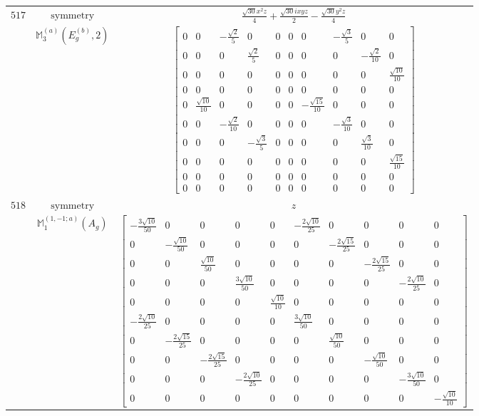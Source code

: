 \documentclass[fleqn,8pt,landscape]{jsarticle}
\begin{document}
\begin{longtable}{ccc}
$ 517 $ & $ \text{symmetry} $ & $ \frac{\sqrt{30} x^{2} z}{4} + \frac{\sqrt{30} i x y z}{2} - \frac{\sqrt{30} y^{2} z}{4} $ \\
$  $ & $ \mathbb{M}_{3}^{(a)}(E_{g}^{(b)},2) $ & $ \begin{bmatrix} 0 & 0 & - \frac{\sqrt{2}}{5} & 0 & 0 & 0 & 0 & - \frac{\sqrt{3}}{5} & 0 & 0 \\ 0 & 0 & 0 & \frac{\sqrt{2}}{5} & 0 & 0 & 0 & 0 & - \frac{\sqrt{2}}{10} & 0 \\ 0 & 0 & 0 & 0 & 0 & 0 & 0 & 0 & 0 & \frac{\sqrt{10}}{10} \\ 0 & 0 & 0 & 0 & 0 & 0 & 0 & 0 & 0 & 0 \\ 0 & \frac{\sqrt{10}}{10} & 0 & 0 & 0 & 0 & - \frac{\sqrt{15}}{10} & 0 & 0 & 0 \\ 0 & 0 & - \frac{\sqrt{2}}{10} & 0 & 0 & 0 & 0 & - \frac{\sqrt{3}}{10} & 0 & 0 \\ 0 & 0 & 0 & - \frac{\sqrt{3}}{5} & 0 & 0 & 0 & 0 & \frac{\sqrt{3}}{10} & 0 \\ 0 & 0 & 0 & 0 & 0 & 0 & 0 & 0 & 0 & \frac{\sqrt{15}}{10} \\ 0 & 0 & 0 & 0 & 0 & 0 & 0 & 0 & 0 & 0 \\ 0 & 0 & 0 & 0 & 0 & 0 & 0 & 0 & 0 & 0 \end{bmatrix} $ \\ \hline
$ 518 $ & $ \text{symmetry} $ & $ z $ \\
$  $ & $ \mathbb{M}_{1}^{(1,-1;a)}(A_{g}) $ & $ \begin{bmatrix} - \frac{3 \sqrt{10}}{50} & 0 & 0 & 0 & 0 & - \frac{2 \sqrt{10}}{25} & 0 & 0 & 0 & 0 \\ 0 & - \frac{\sqrt{10}}{50} & 0 & 0 & 0 & 0 & - \frac{2 \sqrt{15}}{25} & 0 & 0 & 0 \\ 0 & 0 & \frac{\sqrt{10}}{50} & 0 & 0 & 0 & 0 & - \frac{2 \sqrt{15}}{25} & 0 & 0 \\ 0 & 0 & 0 & \frac{3 \sqrt{10}}{50} & 0 & 0 & 0 & 0 & - \frac{2 \sqrt{10}}{25} & 0 \\ 0 & 0 & 0 & 0 & \frac{\sqrt{10}}{10} & 0 & 0 & 0 & 0 & 0 \\ - \frac{2 \sqrt{10}}{25} & 0 & 0 & 0 & 0 & \frac{3 \sqrt{10}}{50} & 0 & 0 & 0 & 0 \\ 0 & - \frac{2 \sqrt{15}}{25} & 0 & 0 & 0 & 0 & \frac{\sqrt{10}}{50} & 0 & 0 & 0 \\ 0 & 0 & - \frac{2 \sqrt{15}}{25} & 0 & 0 & 0 & 0 & - \frac{\sqrt{10}}{50} & 0 & 0 \\ 0 & 0 & 0 & - \frac{2 \sqrt{10}}{25} & 0 & 0 & 0 & 0 & - \frac{3 \sqrt{10}}{50} & 0 \\ 0 & 0 & 0 & 0 & 0 & 0 & 0 & 0 & 0 & - \frac{\sqrt{10}}{10} \end{bmatrix} $ \\ \hline

\end{longtable}
\end{document}
